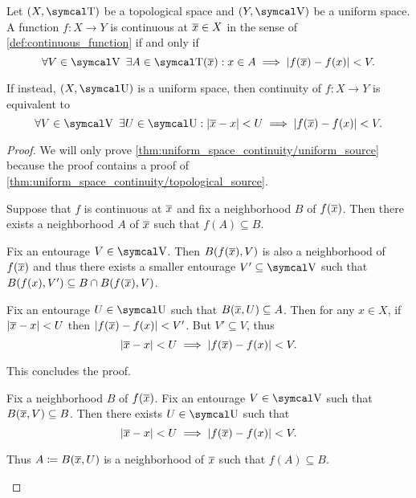 \begin{proposition}\label{thm:uniform_space_continuity}
  Let \( (X, \T) \) be a topological space and \( (Y, \V) \) be a uniform space. A function \( f: X \to Y \) is continuous at \( \overline{x} \in X \) in the sense of \cref{def:continuous_function} if and only if
  \begin{equation}\label{thm:uniform_space_continuity/topological_source}
    \forall V \in \V \ \exists A \in \T(\Ol x) : x \in A \implies \Abs{f(\Ol{x}) - f(x)} < V.
  \end{equation}

  If instead, \( (X, \U) \) is a uniform space, then continuity of \( f: X \to Y \) is equivalent to
  \begin{equation}\label{thm:uniform_space_continuity/uniform_source}
    \forall V \in \V \ \exists U \in \U : \Abs{\Ol{x} - x} < U \implies \Abs{f(\Ol{x}) - f(x)} < V.
  \end{equation}
\end{proposition}
\begin{proof}
  We will only prove \cref{thm:uniform_space_continuity/uniform_source} because the proof contains a proof of \cref{thm:uniform_space_continuity/topological_source}.

  \begin{description}
    \Implies Suppose that \( f \) is continuous at \( \overline{x} \) and fix a neighborhood \( B \) of \( f(\overline{x}) \). Then there exists a neighborhood \( A \) of \( \overline{x} \) such that \( f(A) \subseteq B \).

    Fix an entourage \( V \in \V \). Then \( B(f(\overline{x}), V) \) is also a neighborhood of \( f(\overline{x}) \) and thus there exists a smaller entourage \( V' \subseteq \V \) such that \( B(f(x), V') \subseteq B \cap B(f(\overline{x}), V) \).

    Fix an entourage \( U \in \U \) such that \( B(\overline{x}, U) \subseteq A \). Then for any \( x \in X \), if \( \left\vert \overline{x} - x \right\vert < U \) then \( \left\vert f(\overline{x}) - f(x) \right\vert < V' \). But \( V' \subseteq V \), thus
    \begin{equation*}
      \left\vert \overline{x} - x \right\vert < U \implies \left\vert f(\overline{x}) - f(x) \right\vert < V.
    \end{equation*}

    This concludes the proof.

    \ImpliedBy Fix a neighborhood \( B \) of \( f(\overline{x}) \). Fix an entourage \( V \in \V \) such that \( B(\overline{x}, V) \subseteq B \). Then there exists \( U \in \U \) such that
    \begin{equation*}
      \left\vert \overline{x} - x \right\vert < U \implies \left\vert f(\overline{x}) - f(x) \right\vert < V.
    \end{equation*}

    Thus \( A \coloneqq B(\overline{x}, U) \) is a neighborhood of \( \overline{x} \) such that \( f(A) \subseteq B \).
  \end{description}
\end{proof}

